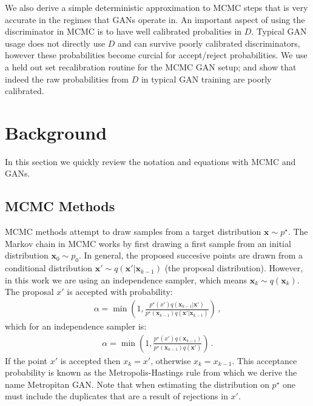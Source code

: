 \documentclass{article}
\renewcommand{\vec}[1]{{\boldsymbol{\mathbf{#1}}}} %
\newcommand{\sample}{\sim}
\newcommand{\given}{|}
\newcommand{\target}{{p^\star}}
\newcommand{\prop}{q}
\newcommand{\pinit}{{p_0}}
\begin{document}
We also derive a simple deterministic approximation to MCMC steps that is very accurate in the regimes that GANs operate in.
An important aspect of using the discriminator in MCMC is to have well calibrated probalities in $D$.
Typical GAN usage does not directly use $D$ and can survive poorly calibrated discriminators, however these probabilities become curcial for accept/reject probabilities.
We use a held out set recalibration routine for the MCMC GAN setup; and show that indeed the raw probabilities from $D$ in typical GAN training are poorly calibrated.

\section{Background}

In this section we quickly review the notation and equations with MCMC and GANs.

\subsection{MCMC Methods}

MCMC methods attempt to draw samples from a target distribution $\vec x \sample \target$.
The Markov chain in MCMC works by first drawing a first sample from an initial distribution $\vec x_0 \sample \pinit$.
In general, the proposed succesive points are drawn from a conditional distribution $\vec x' \sample \prop(\vec x' \given \vec x_{k-1})$ (the proposal distribution)\@.
However, in this work we are using an independence sampler, which means $\vec x_k \sample \prop(\vec x_k)$.
The proposal $x'$ is accepted with probability:
\begin{align}
  \alpha = \min\left(1, \frac{\target(x')\prop(\vec x_{k-1} \given \vec x')}{\target(\vec x_{k-1})\prop(\vec x' \given \vec x_{k-1})}\right)\,,
\end{align}
which for an independence sampler is:
\begin{align}
  \alpha = \min\left(1, \frac{\target(x')\prop(\vec x_{k-1})}{\target(\vec x_{k-1})\prop(\vec x')}\right)\,.
\end{align}
If the point $x'$ is accepted then $x_k = x'$, otherwise $x_k = x_{k-1}$.
This acceptance probability is known as the Metropolis-Hastings rule from which we derive the name Metropitan GAN\@.
Note that when estimating the distribution on $\target$ one must include the duplicates that are a result of rejections in $x'$.
\end{document}

